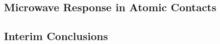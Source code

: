     \subsection{Microwave Response in Atomic Contacts}
    \label{subsec:results:ac:microwave}


    \subsection{Interim Conclusions}
    \label{subsec:results:ac:conclusion}

